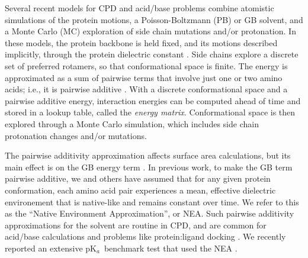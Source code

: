 \documentclass[a4paper,12pt]{article}
\newcommand{\pk}{pK$_a$}
\begin{document}
Several recent models for CPD \cite{Baker06b,Kuhlman06,Guerois07,Lippow07,Pleiss11, Pantazes11,Saven11,Samish11,
Simonson13b} and acid/base problems \cite{You95,Beroza96,Georgescu02,Kim05,Song09,Aleksandrov10b,Baptista97,Lee04,
Mongan04,Khandogin06,Machuqueiro08,Wallace09,Arthur11} combine atomistic simulations of the protein motions, a
Poisson-Boltzmann (PB) or GB solvent, and a Monte Carlo (MC) exploration of side chain mutations and/or protonation.
In these models, the protein backbone is held fixed, and its motions described implicitly, through the protein
dielectric constant \cite{Simonson13}. Side chains explore a discrete set of preferred rotamers, so that conformational
space is finite. The energy is approximated as a sum of pairwise terms that involve just one or two amino acids; i.e.,
it is pairwise additive \cite{Lopes07,Schmidt08,Schmidt08b,Polydorides11,Simonson13b,Gaillard14}. With a discrete
conformational space and a pairwise additive energy, interaction energies can be computed ahead of time and
stored in a lookup table, called the {\it energy matrix}. Conformational space is then explored through a Monte Carlo
simulation, which includes side chain protonation changes and/or mutations.

The pairwise additivity approximation affects surface area calculations, but its main effect is on the GB energy term
\cite{Polydorides13,Gaillard14}. In previous work, to make the GB term pairwise additive, we and others have assumed
that for any given protein conformation, each amino acid pair experiences a mean, effective dielectric environement
that is native-like and remains constant over time. We refer to this as the ``Native Environment Approximation'',
or NEA. Such pairwise additivity approximations for the solvent are routine in CPD, and are common for acid/base
calculations \cite{Georgescu02,Gunner11} and problems like protein:ligand docking \cite{Majeux00,Ruvinsky07}.
We recently reported an extensive \pk\ benchmark test that used the NEA \cite{Polydorides13}.
\end{document}
